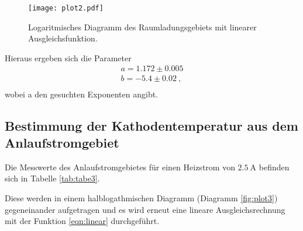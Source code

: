 \begin{figure}[H]
  \centering
  \texttt{[image: plot2.pdf]}
  \caption{Logaritmisches Diagramm des Raumladungsgebiets mit linearer Ausgleichsfunktion.}
  \label{fig:plot2}
\end{figure}

Hieraus ergeben sich die Parameter
\begin{align*}
  a = 1.172 \pm 0.005 \\
  b = -5.4 \pm 0.02 \: ,\\
\end{align*}
wobei a den gesuchten Exponenten angibt.
\subsection{Bestimmung der Kathodentemperatur aus dem Anlaufstromgebiet}
Die Messwerte des Anlaufstromgebietes für einen Heizstrom von $\SI{2.5}{\ampere}$
befinden sich in Tabelle \ref{tab:tabe3}.

Diese werden in einem halblogathmischen Diagramm (Diagramm \ref{fig:plot3}) gegeneinander
aufgetragen und es wird erneut eine lineare Ausgleichsrechnung mit der Funktion \ref{eqn:linear}
durchgeführt.

